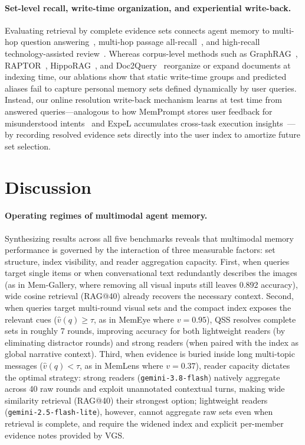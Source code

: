 \documentclass[10pt]{article}
\newcommand{\qss}{QSS}
\begin{document}
\paragraph{Set-level recall, write-time organization, and experiential write-back.} Evaluating retrieval by complete evidence sets connects agent memory to multi-hop question answering~\citep{yang2018hotpotqa}, multi-hop passage all-recall~\citep{gutierrez2024hipporag}, and high-recall technology-assisted review~\citep{cormack2015autonomy}. Whereas corpus-level methods such as GraphRAG~\citep{edge2024graphrag}, RAPTOR~\citep{sarthi2024raptor}, HippoRAG~\citep{gutierrez2024hipporag}, and Doc2Query~\citep{nogueira2019doc2query} reorganize or expand documents at indexing time, our ablations show that static write-time groups and predicted aliases fail to capture personal memory sets defined dynamically by user queries. Instead, our online resolution write-back mechanism learns at test time from answered queries—analogous to how MemPrompt stores user feedback for misunderstood intents~\citep{madaan2022memprompt} and ExpeL accumulates cross-task execution insights~\citep{zhao2024expel}—by recording resolved evidence sets directly into the user index to amortize future set selection.

\section{Discussion}
\label{sec:discussion}

\paragraph{Operating regimes of multimodal agent memory.} Synthesizing results across all five benchmarks reveals that multimodal memory performance is governed by the interaction of three measurable factors: set structure, index visibility, and reader aggregation capacity. First, when queries target single items or when conversational text redundantly describes the images (as in Mem-Gallery, where removing all visual inputs still leaves 0.892 accuracy), wide cosine retrieval (RAG@40) already recovers the necessary context. Second, when queries target multi-round visual sets and the compact index exposes the relevant cues ($\hat{v}(q) \ge \tau$, as in MemEye where $v{=}0.95$), \qss{} resolves complete sets in roughly 7 rounds, improving accuracy for both lightweight readers (by eliminating distractor rounds) and strong readers (when paired with the index as global narrative context). Third, when evidence is buried inside long multi-topic messages ($\hat{v}(q) < \tau$, as in MemLens where $v{=}0.37$), reader capacity dictates the optimal strategy: strong readers (\texttt{gemini-3.8-flash}) natively aggregate across 40 raw rounds and exploit unannotated contextual turns, making wide similarity retrieval (RAG@40) their strongest option; lightweight readers (\texttt{gemini-2.5-flash-lite}), however, cannot aggregate raw sets even when retrieval is complete, and require the widened index and explicit per-member evidence notes provided by VGS.
\end{document}
